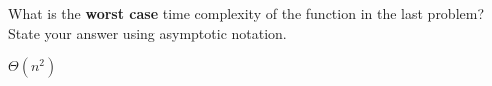\begin{prob}
    What is the \textbf{worst case} time complexity of the function in the last problem?
    State your answer using asymptotic notation.

    \begin{soln}
        $\Theta(n^2)$
    \end{soln}

\end{prob}
